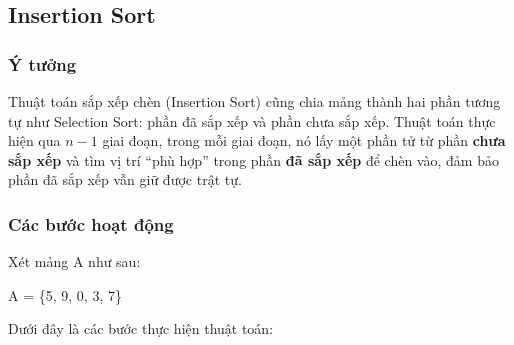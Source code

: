 \subsection{Insertion Sort}

\subsubsection{Ý tưởng}

Thuật toán sắp xếp chèn (Insertion Sort) cũng chia mảng thành hai phần tương tự như Selection Sort: phần đã sắp xếp và phần chưa sắp xếp. Thuật toán thực hiện qua $n - 1$ giai đoạn, trong mỗi giai đoạn, nó lấy một phần tử từ phần \textbf{chưa sắp xếp} và tìm vị trí “phù hợp” trong phần \textbf{đã sắp xếp} để chèn vào, đảm bảo phần đã sắp xếp vẫn giữ được trật tự.

\subsubsection{Các bước hoạt động}
Xét mảng A như sau: 
\begin{center}
   A = \{5, 9, 0, 3, 7\} 
\end{center} 
Dưới đây là các bước thực hiện thuật toán:



